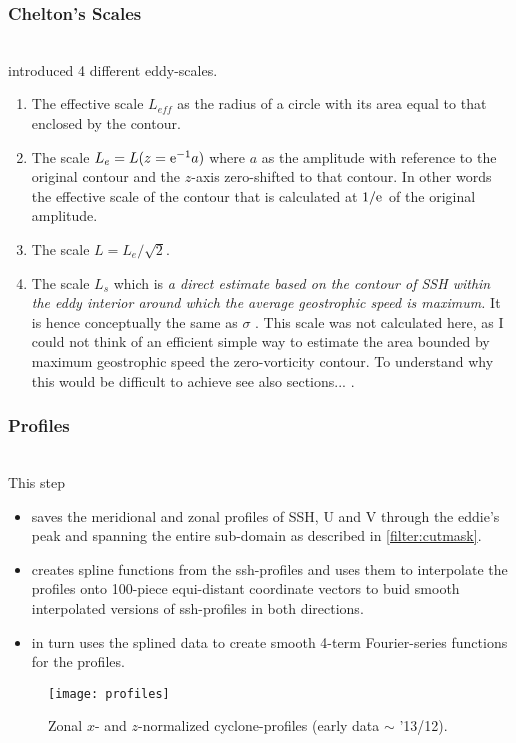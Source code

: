 \subsubsection{Chelton's Scales} \label{filter:chstuff}
\\
\cite{chelton2011} introduced 4 different eddy-scales.
\begin{enumerate}
	\item
	The effective scale $L_{eff}$ as the radius of a circle with its area equal to that enclosed by the contour.
	\item
	The scale $L_e  = L(z=\mathrm{e}^{-1} a)$ where $a$ as the amplitude with reference to the original contour and the $z$-axis zero-shifted to that contour. In other words the effective scale of the contour that is calculated at $1/\mathrm{e}^{}$ of the original amplitude.
	\item
	The scale $L=L_e/\sqrt{2}$.
	\item
	The scale $L_s$ which is \textit{a direct estimate based on the contour of SSH within the eddy interior around which the average geostrophic speed is maximum.} \citep{chelton2011} It is hence conceptually the same as $\sigma$ . This scale was not calculated here, as I could not think of an efficient simple way to estimate the area bounded by maximum geostrophic speed \ie the zero-vorticity contour. To understand why this would be difficult to achieve see also sections... .  
\end{enumerate}
\subsubsection{Profiles}\label{filter:profiles}
\\
This step
\begin{itemize}
\item 
 saves the meridional and zonal profiles of SSH, U and V through  the eddie's peak and spanning the entire sub-domain as described in \ref{filter:cutmask}.
\item
creates spline functions from the ssh-profiles and uses them to interpolate the profiles onto 100-piece equi-distant coordinate vectors to buid smooth interpolated versions of ssh-profiles in both directions.
\item
in turn uses the splined data to create smooth 4-term Fourier-series functions for the profiles.
\end{itemize}
\begin{wrapfigure}{r}{0.4\textwidth}
	\texttt{[image: profiles]}
	\caption{Zonal $x$- and $z$-normalized cyclone-profiles (early data $\sim$ '13/12).}
	\label{fig:profiles}
\end{wrapfigure}

